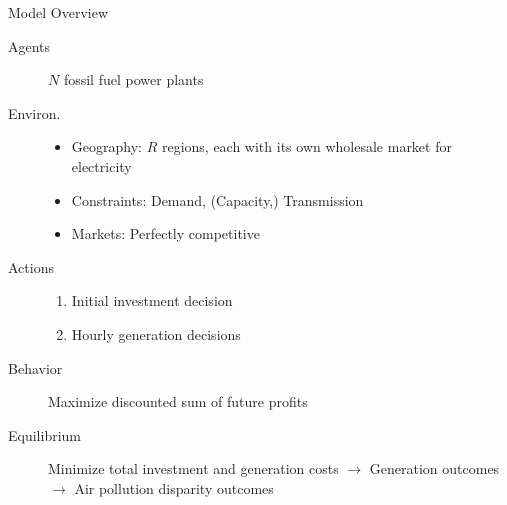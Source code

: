\documentclass[11pt, aspectratio = 169]{beamer}
\begin{document}
\begin{frame}{Model Overview}

\begin{description}
    \item[Agents] $N$ fossil fuel power plants
    \vfill
    \item[Environ.]\begin{itemize}
        \item Geography: $R$ regions, each with its own wholesale market for electricity
        \item Constraints: Demand, (Capacity,) Transmission
        \item Markets: Perfectly competitive
    \end{itemize}  
    \vfill 
    \item[Actions]\begin{enumerate}
        \item Initial investment decision
        \item Hourly generation decisions
    \end{enumerate}
    \vfill
    \item[Behavior] Maximize discounted sum of future profits
    \vfill
    \item[Equilibrium] Minimize total investment and generation costs $\to$ Generation outcomes $\to$ Air pollution disparity outcomes 
\end{description}

\end{frame}


\begin{frame}{}
    
\end{frame}



\end{document}
